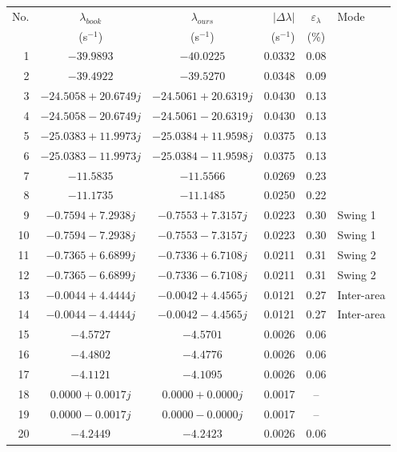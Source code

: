 \begin{tabular}{rccrcl}\toprule
{No.} & {$\lambda_{book}$} & {$\lambda_{ours}$} & {$|\Delta\lambda|$} & {$\varepsilon_{\lambda}$} & {Mode}\\
{} & {(s$^{-1}$)} & {(s$^{-1}$)} & {(s$^{-1}$)} & {(\%)} & {}\\ \midrule
1 & $-39.9893$ & $-40.0225$ & 0.0332 & {0.08} & \\
2 & $-39.4922$ & $-39.5270$ & 0.0348 & {0.09} & \\
3 & $-24.5058 +20.6749j$ & $-24.5061 +20.6319j$ & 0.0430 & {0.13} & \\
4 & $-24.5058 -20.6749j$ & $-24.5061 -20.6319j$ & 0.0430 & {0.13} & \\
5 & $-25.0383 +11.9973j$ & $-25.0384 +11.9598j$ & 0.0375 & {0.13} & \\
6 & $-25.0383 -11.9973j$ & $-25.0384 -11.9598j$ & 0.0375 & {0.13} & \\
7 & $-11.5835$ & $-11.5566$ & 0.0269 & {0.23} & \\
8 & $-11.1735$ & $-11.1485$ & 0.0250 & {0.22} & \\
9 & $-0.7594 +7.2938j$ & $-0.7553 +7.3157j$ & 0.0223 & {0.30} & Swing 1\\
10 & $-0.7594 -7.2938j$ & $-0.7553 -7.3157j$ & 0.0223 & {0.30} & Swing 1\\
11 & $-0.7365 +6.6899j$ & $-0.7336 +6.7108j$ & 0.0211 & {0.31} & Swing 2\\
12 & $-0.7365 -6.6899j$ & $-0.7336 -6.7108j$ & 0.0211 & {0.31} & Swing 2\\
13 & $-0.0044 +4.4444j$ & $-0.0042 +4.4565j$ & 0.0121 & {0.27} & Inter-area\\
14 & $-0.0044 -4.4444j$ & $-0.0042 -4.4565j$ & 0.0121 & {0.27} & Inter-area\\
15 & $-4.5727$ & $-4.5701$ & 0.0026 & {0.06} & \\
16 & $-4.4802$ & $-4.4776$ & 0.0026 & {0.06} & \\
17 & $-4.1121$ & $-4.1095$ & 0.0026 & {0.06} & \\
18 & $0.0000 +0.0017j$ & $0.0000 +0.0000j$ & 0.0017 & {--} & \\
19 & $0.0000 -0.0017j$ & $0.0000 -0.0000j$ & 0.0017 & {--} & \\
20 & $-4.2449$ & $-4.2423$ & 0.0026 & {0.06} & \\
\bottomrule\end{tabular}

